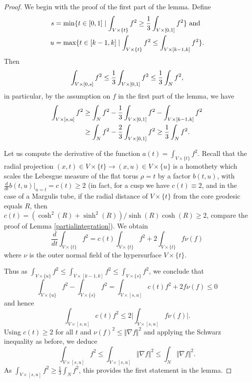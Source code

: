 \documentclass[11pt]{amsart}
\theoremstyle{plain}
\theoremstyle{plain}
\theoremstyle{definition}
\begin{document}
\begin{proof} We begin with the proof of the first part of the lemma. Define 
  \begin{align}
    s&=\min\{t\in  [0,1]\mid \int_{V\times \{t\}}f^2
\geq \frac{1}{3}\int_{V\times [0,1]}f^2\}\text{ and }\notag\\
    u&=\max\{t\in [k-1,k]\mid
    \int_{V\times \{t\}}f^2\leq \int_{V\times [k-1,k]}f^2\}.\notag
    \end{align}
Then 
\begin{equation}
\int_{V\times [0,s]}f^2\leq \frac{1}{3}\int_{V\times [0,1]}f^2\leq 
\frac{1}{3}\int_N f^2,
\notag\end{equation}
in particular, by the assumption on $f$ in the first part
of the lemma, we have
\begin{align}
  \int_{V\times [s,u]}f^2& \geq \int_Nf^2-
\frac{1}{3}\int_{V\times [0,1]}f^2
  -\int_{V\times [k-1,k]}f^2\notag\\
&  \geq \int_Nf^2-
  \frac{2}{3}\int_{V\times [0,1]}f^2\geq \frac{1}{3}\int_Nf^2.
\notag\end{align}

Let us compute the derivative of the function
$a(t)=\int_{V\times \{t\}}f^2$. Recall that the radial projection 
$(x,t)\in V\times \{t\}\to (x,u)\in V\times \{u\}$ 
is a homothety which
scales the Lebesgue measure of the flat torus $\rho=t$ by 
a factor $b(t,u)$, with $\frac{d}{dt}b(t,u)\vert_{u=t}=c(t)\geq 2$
(in fact, for a cusp we have $c(t)\equiv 2$, and in the
case of a Margulis tube, if the radial distance
of $V\times \{t\}$ from the core geodesic equals $R$, then
$c(t)=(\cosh^2(R)+\sinh^2(R))/\sinh(R)\cosh(R)\geq 2$, compare the proof of Lemma
\ref{partialintegration}).
We obtain
\begin{equation}\label{areaderi}
  \frac{d}{dt}\int_{V\times \{t\}}f^2=c(t)\int_{V\times \{t\}}f^2
+2\int_{V\times \{t\}}f\nu(f)\end{equation}
where $\nu$ is the outer normal field of the hypersurface $V\times \{t\}$. 

Thus as $\int_{V\times \{u\}}f^2\leq \int_{V\times [k-1,k]}f^2
\leq \int_{V\times \{s\}}f^2$, we conclude that 
\begin{equation}\label{integral4}
  \int_{V\times \{u\}}f^2-\int_{V\times \{s\}}f^2=
\int_{V\times [s,u]} c(t)f^2+2f\nu(f)\leq 0\end{equation}
and hence 
\[\int_{V\times [s,u] }c(t)f^2\leq 2\vert \int_{V\times [s,u]} f\nu(f)\vert.\]
Using $c(t)\geq 2$ for all $t$ and $\nu(f)^2\leq \Vert \nabla f\Vert^2$ and
applying the Schwarz inequality as before,
we deduce
\begin{equation}\label{integral3} 
\int_{V\times [s,u]} f^2\leq \int_{V\times [s,u]}\Vert \nabla f\Vert^2\leq \int_N\Vert \nabla f\Vert^2.
\end{equation}
As
$\int_{V\times [s,u]}f^2\geq \frac{1}{3}\int_Nf^2$,
this provides the first statement in the lemma. 


\end{proof}
\end{document}
